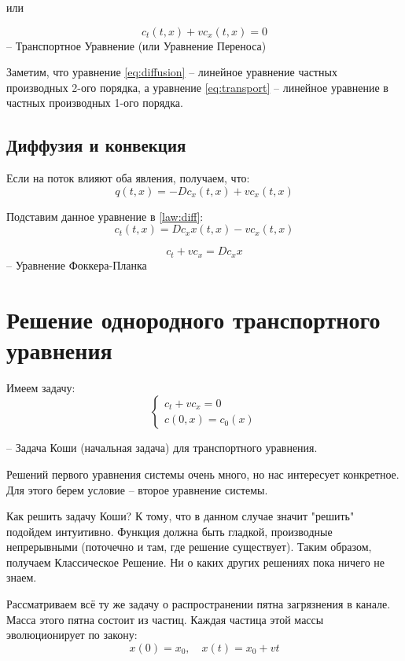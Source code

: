 \documentclass[12pt]{report}
\begin{document}
или 

\begin{equation} \label{eq:transport}
    c_t(t,x) + vc_x(t,x) = 0
\end{equation}
-- Транспортное Уравнение (или Уравнение Переноса)

Заметим, что уравнение \eqref{eq:diffusion} -- линейное уравнение частных производных 2-ого порядка, а уравнение \eqref{eq:transport} -- линейное уравнение в частных производных 1-ого порядка. 

\subsection{Диффузия и конвекция}

Если на поток влияют оба явления, получаем, что: 
$$q(t,x) = -Dc_x(t,x) + vc_x(t,x)$$

Подставим данное уравнение в \eqref{law:diff}: 
$$c_t(t,x) = Dc_xx(t,x) - vc_x(t,x)$$

\begin{equation} \label{eq:Fokker-Planck}
    c_t + vc_x = Dc_xx
\end{equation}
    -- Уравнение Фоккера-Планка
    
\section{Решение однородного транспортного уравнения}

Имеем задачу: 
\begin{equation} \label{pro:Cauchy}
    \begin{cases}
        c_t + vc_x = 0
        \\
        c(0,x) = c_0(x)
    \end{cases}
\end{equation}

    -- Задача Коши (начальная задача) для транспортного уравнения. 
    
Решений первого уравнения системы очень много, но нас интересует конкретное. Для этого берем условие -- второе уравнение системы.

Как решить задачу Коши? К тому, что в данном случае значит "решить" подойдем интуитивно. Функция должна быть гладкой, производные непрерывными (поточечно и там, где решение существует). Таким образом, получаем Классическое Решение. Ни о каких других решениях пока ничего не знаем. 

Рассматриваем всё ту же задачу о распространении пятна загрязнения в канале. Масса этого пятна состоит из частиц. Каждая частица этой массы эволюционирует по закону: 
$$x(0) = x_0, \quad x(t) = x_0 + vt$$
\end{document}

